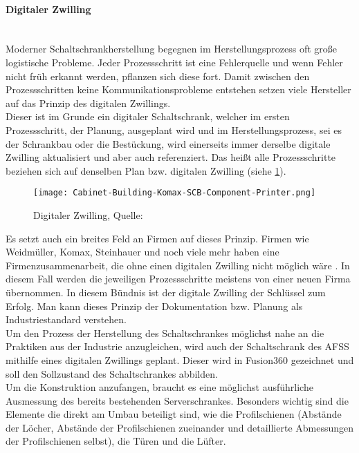     \paragraph{Digitaler Zwilling}\mbox{}\\
    Moderner Schaltschrankherstellung begegnen im Herstellungsprozess oft große logistische Probleme. Jeder Prozessschritt ist eine Fehlerquelle und wenn Fehler nicht früh erkannt werden, pflanzen sich diese fort. Damit zwischen den Prozessschritten keine Kommunikationsprobleme entstehen setzen viele Hersteller auf das Prinzip des digitalen Zwillings.\\
    Dieser ist im Grunde ein digitaler Schaltschrank, welcher im ersten Prozessschritt, der Planung, ausgeplant wird und im Herstellungsprozess, sei es der Schrankbau oder die Bestückung, wird einerseits immer derselbe digitale Zwilling aktualisiert und aber auch referenziert. Das heißt alle Prozessschritte beziehen sich auf denselben Plan bzw. digitalen Zwilling (siehe \ref{fig:digilaerZwilling}).
    \begin{figure}[h]
        \centering
        \texttt{[image: Cabinet-Building-Komax-SCB-Component-Printer.png]}
        \caption{Digitaler Zwilling, Quelle: \cite{digitaler_zwilling_bild}}
        \label{fig:digilaerZwilling}
    \end{figure}
    Es setzt auch ein breites Feld an Firmen auf dieses Prinzip. Firmen wie Weidmüller, Komax, Steinhauer und noch viele mehr haben eine Firmenzusammenarbeit, die ohne einen digitalen Zwilling nicht möglich wäre \cite{smart_cabinet_building}. In diesem Fall werden die jeweiligen Prozessschritte meistens von einer neuen Firma übernommen. In diesem Bündnis ist der digitale Zwilling der Schlüssel zum Erfolg. Man kann dieses Prinzip der Dokumentation bzw. Planung als Industriestandard verstehen.\\
    Um den Prozess der Herstellung des Schaltschrankes möglichst nahe an die Praktiken aus der Industrie anzugleichen, wird auch der Schaltschrank des AFSS mithilfe eines digitalen Zwillings geplant. Dieser wird in Fusion360 gezeichnet und soll den Sollzustand des Schaltschrankes abbilden.\\
    Um die Konstruktion anzufangen, braucht es eine möglichst ausführliche Ausmessung des bereits bestehenden Serverschrankes. Besonders wichtig sind die Elemente die direkt am Umbau beteiligt sind, wie die Profilschienen (Abstände der Löcher, Abstände der Profilschienen zueinander und detaillierte Abmessungen der Profilschienen selbst), die Türen und die Lüfter.\\

